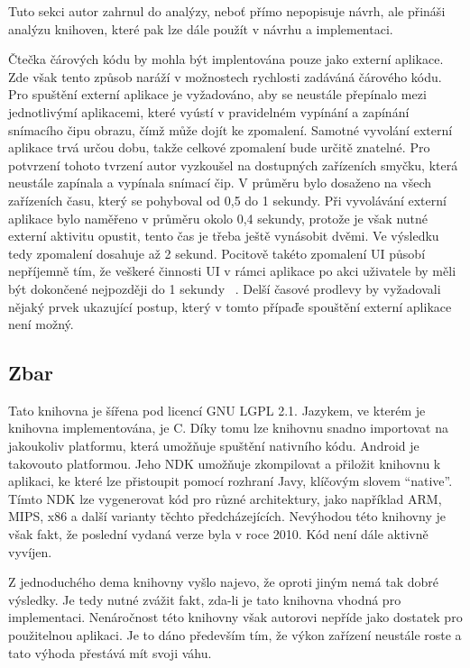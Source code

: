 \documentclass[thesis=B,czech]{FITthesis}[2013/10/20]
\begin{document}
Tuto sekci autor zahrnul do analýzy, neboť přímo nepopisuje návrh, ale přináši analýzu knihoven, které pak lze dále použít v návrhu a implementaci.

Čtečka čárových kódu by mohla být implentována pouze jako externí aplikace. Zde však tento způsob naráží v možnostech rychlosti zadáváná čárového kódu. Pro spuštění externí aplikace je vyžadováno, aby se neustále přepínalo mezi jednotlivýmí aplikacemi, které vyústí v pravidelném vypínání a zapínání snímacího čipu obrazu, čímž může dojít ke zpomalení. Samotné vyvolání externí aplikace trvá určou dobu, takže celkové zpomalení bude určitě znatelné. Pro potvrzení tohoto tvrzení autor vyzkoušel na dostupných zařízeních smyčku, která neustále zapínala a vypínala snímací čip. V průměru bylo dosaženo na všech zařízeních času, který se pohyboval od 0,5 do 1 sekundy. Při vyvolávání externí aplikace bylo naměřeno v průměru okolo 0,4 sekundy, protože je však nutné externí aktivitu opustit,  tento čas je třeba ještě vynásobit dvěmi. Ve výsledku tedy zpomalení dosahuje až 2 sekund. Pocitově takéto zpomalení UI působí nepříjemně tím, že veškeré činnosti UI v rámci aplikace po akci uživatele by měli být dokončené nejpozději do 1 sekundy ~\cite{ui_maxlag}. Delší časové prodlevy by vyžadovali nějaký prvek ukazující postup, který v tomto přípaďe spouštění externí aplikace není možný.

\subsection{Zbar ~\cite{zbar}}

Tato knihovna je šířena pod licencí GNU LGPL 2.1. Jazykem, ve kterém je knihovna implementována, je C. Díky tomu lze knihovnu snadno importovat na jakoukoliv platformu, která umožňuje spuštění nativního kódu. Android je takovouto platformou. Jeho NDK umožňuje zkompilovat a přiložit knihovnu k aplikaci, ke které lze přistoupit pomocí rozhraní Javy, klíčovým slovem ``native''. Tímto NDK lze vygenerovat kód pro různé architektury, jako například ARM, MIPS, x86 a další varianty těchto předcházejících. Nevýhodou této knihovny je však fakt, že poslední vydaná verze byla v roce 2010. Kód není dále aktivně vyvíjen.

Z jednoduchého dema knihovny vyšlo najevo, že oproti jiným nemá tak dobré výsledky. Je tedy nutné zvážit fakt, zda-li je tato knihovna vhodná pro implementaci. Nenáročnost této knihovny však autorovi nepříde jako dostatek pro použitelnou aplikaci. Je to dáno především tím, že výkon zařízení neustále roste a tato výhoda přestává mít svoji váhu.
\end{document}
